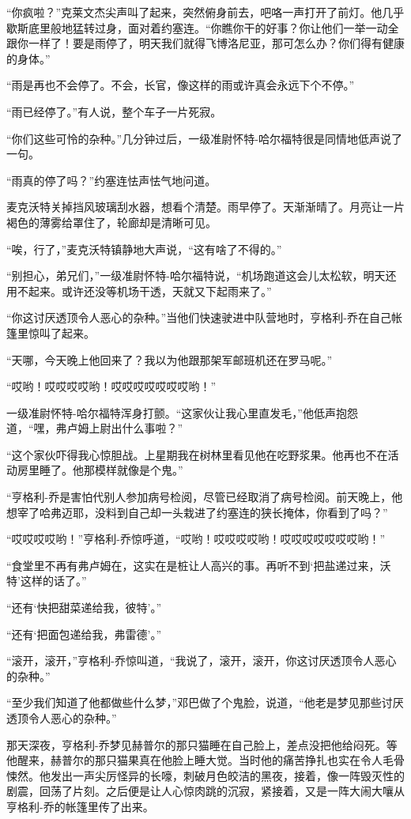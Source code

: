     “你疯啦？”克莱文杰尖声叫了起来，突然俯身前去，吧咯一声打开了前灯。他几乎歇斯底里般地猛转过身，面对着约塞连。“你瞧你干的好事？你让他们一举一动全跟你一样了！要是雨停了，明天我们就得飞博洛尼亚，那可怎么办？你们得有健康的身体。”

    “雨是再也不会停了。不会，长官，像这样的雨或许真会永远下个不停。”

    “雨已经停了。”有人说，整个车子一片死寂。

    “你们这些可怜的杂种。”几分钟过后，一级准尉怀特-哈尔福特很是同情地低声说了一句。

    “雨真的停了吗？”约塞连怯声怯气地问道。

    麦克沃特关掉挡风玻璃刮水器，想看个清楚。雨早停了。天渐渐晴了。月亮让一片褐色的薄雾给罩住了，轮廊却是清晰可见。

    “唉，行了，”麦克沃特镇静地大声说，“这有啥了不得的。”

    “别担心，弟兄们，”一级准尉怀特-哈尔福特说，“机场跑道这会儿太松软，明天还用不起来。或许还没等机场干透，天就又下起雨来了。”

    “你这讨厌透顶令人恶心的杂种。”当他们快速驶进中队营地时，亨格利-乔在自己帐篷里惊叫了起来。

    “天哪，今天晚上他回来了？我以为他跟那架军邮班机还在罗马呢。”

    “哎哟！哎哎哎哎哟！哎哎哎哎哎哎哎哟！”

    一级准尉怀特-哈尔福特浑身打颤。“这家伙让我心里直发毛，”他低声抱怨道，“嘿，弗卢姆上尉出什么事啦？”

    “这个家伙吓得我心惊胆战。上星期我在树林里看见他在吃野浆果。他再也不在活动房里睡了。他那模样就像是个鬼。”

    “亨格利-乔是害怕代别人参加病号检阅，尽管已经取消了病号检阅。前天晚上，他想宰了哈弗迈耶，没料到自己却一头栽进了约塞连的狭长掩体，你看到了吗？”

    “哎哎哎哎哟！”亨格利-乔惊呼道，“哎哟！哎哎哎哎哟！哎哎哎哎哎哎哎哟！”

    “食堂里不再有弗卢姆在，这实在是桩让人高兴的事。再听不到‘把盐递过来，沃特’这样的话了。”

    “还有‘快把甜菜递给我，彼特’。”

    “还有‘把面包递给我，弗雷德’。”

    “滚开，滚开，”亨格利-乔惊叫道，“我说了，滚开，滚开，你这讨厌透顶令人恶心的杂种。”

    “至少我们知道了他都做些什么梦，”邓巴做了个鬼脸，说道，“他老是梦见那些讨厌透顶令人恶心的杂种。”

    那天深夜，亨格利-乔梦见赫普尔的那只猫睡在自己脸上，差点没把他给闷死。等他醒来，赫普尔的那只猫果真在他脸上睡大觉。当时他的痛苦挣扎也实在令人毛骨悚然。他发出一声尖厉怪异的长嚎，刺破月色皎洁的黑夜，接着，像一阵毁灭性的剧震，回荡了片刻。之后便是让人心惊肉跳的沉寂，紧接着，又是一阵大闹大嚷从亨格利-乔的帐篷里传了出来。

